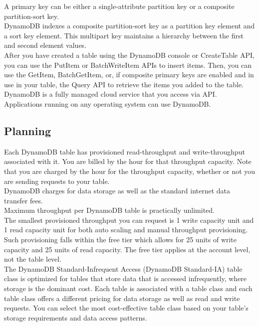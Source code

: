 \documentclass[12pt, letterpaper, twoside]{article}
\begin{document}
A primary key can be either a single-attribute partition key or a composite partition-sort key.\\

DynamoDB indexes a composite partition-sort key as a partition key element and a sort key element. This multipart key maintains 
a hierarchy between the first and second element values.\\

After you have created a table using the DynamoDB console or CreateTable API, you can use the PutItem or BatchWriteItem 
APIs to insert items. Then, you can use the GetItem, BatchGetItem, or, if composite primary keys are enabled and in use 
in your table, the Query API to retrieve the items you added to the table.\\

DynamoDB is a fully managed cloud service that you access via API. Applications running on any operating system can use DynamoDB.

\subsection{Planning}
Each DynamoDB table has provisioned read-throughput and write-throughput associated with it. You are billed by the hour 
for that throughput capacity. Note that you are charged by the hour for the throughput capacity, whether or not you are 
sending requests to your table.\\
DynamoDB charges for data storage as well as the standard internet data transfer fees.\\

Maximum throughput per DynamoDB table is practically unlimited.\\

The smallest provisioned throughput you can request is 1 write capacity unit and 1 read capacity unit for both auto 
scaling and manual throughput provisioning. Such provisioning falls within the free tier which allows for 25 units of 
write capacity and 25 units of read capacity. The free tier applies at the account level, not the table level.\\
The DynamoDB Standard-Infrequent Access (DynamoDB Standard-IA) table class is optimized for tables that store data 
that is accessed infrequently, where storage is the dominant cost. Each table is associated with a table class and 
each table class offers a different pricing for data storage as well as read and write requests. You can select the 
most cost-effective table class based on your table's storage requirements and data access patterns.\\
\end{document}
